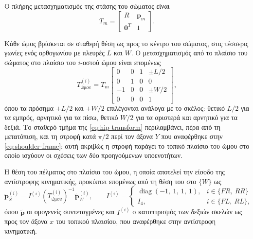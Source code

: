 \documentclass[11pt]{report}
\begin{document}
Ο πλήρης μετασχηματισμός της στάσης του σώματος είναι
\begin{equation}
T_m =
\begin{bmatrix}
R & \mathbf{p}_m \\
\mathbf{0}^{T} & 1
\end{bmatrix}.
\label{eq:body-Tm}
\end{equation}

Κάθε ώμος βρίσκεται σε σταθερή θέση ως προς το κέντρο του σώματος, στις τέσσερις
γωνίες ενός ορθογωνίου με πλευρές $L$ και $W$. Ο μετασχηματισμός από το πλαίσιο
του σώματος στο πλαίσιο του $i$-οστού ώμου είναι επομένως
\begin{equation}
T^{(i)}_{\text{ώμου}} = T_m
\begin{bmatrix}
0 & 0 & 1 & \pm L/2 \\
0 & 1 & 0 & 0 \\
-1 & 0 & 0 & \pm W/2 \\
0 & 0 & 0 & 1
\end{bmatrix},
\label{eq:hip-transform}
\end{equation}
όπου τα πρόσημα $\pm L/2$ και $\pm W/2$ επιλέγονται ανάλογα με το σκέλος:
θετικό $L/2$ για τα εμπρός, αρνητικό για τα πίσω, θετικό $W/2$ για τα αριστερά
και αρνητικό για τα δεξιά. Το σταθερό τμήμα της \eqref{eq:hip-transform}
περιλαμβάνει, πέρα από τη μετατόπιση, και τη στροφή κατά $\pi/2$ περί τον άξονα
$Y$ που αναφέρθηκε στην \eqref{eq:shoulder-frame}: αυτή ακριβώς η στροφή παράγει
το τοπικό πλαίσιο του ώμου στο οποίο ισχύουν οι σχέσεις των δύο προηγούμενων
υποενοτήτων.

Η θέση του πέλματος στο πλαίσιο του ώμου, η οποία αποτελεί την είσοδο της
αντίστροφης κινηματικής, προκύπτει επομένως από τη θέση του στο $\{W\}$ ως
\begin{equation}
\tilde{\mathbf{p}}^{(i)}_{S} = I^{(i)} \left(T^{(i)}_{\text{ώμου}}\right)^{-1}
\tilde{\mathbf{p}}^{(i)}_{W},
\qquad
I^{(i)} =
\begin{cases}
\operatorname{diag}(-1,\ 1,\ 1,\ 1), & i \in \{FR,\ RR\} \\[2pt]
I_4, & i \in \{FL,\ RL\},
\end{cases}
\label{eq:foot-chain}
\end{equation}
όπου $\tilde{\mathbf{p}}$ οι ομογενείς συντεταγμένες και $I^{(i)}$ ο
κατοπτρισμός των δεξιών σκελών ως προς τον άξονα $x$ του τοπικού πλαισίου, που
αναφέρθηκε στην αντίστροφη κινηματική.
\end{document}
